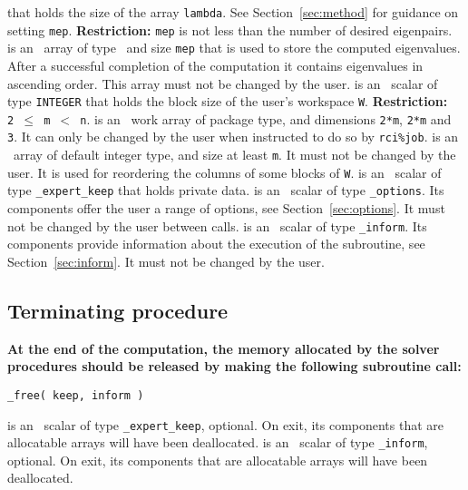 \begin{description}
that holds the size of the array {\tt lambda}.
See Section~\ref{sec:method} for guidance on
setting {\tt mep}.
{\bf Restriction:} 
{\tt mep} is not less than the number of desired eigenpairs.
%
 is an \intentinout\
array of type \REALDP\
and size {\tt mep} that is
used to store the computed eigenvalues.
After a successful completion of the computation
it contains eigenvalues in ascending order.
This array must not be changed by the user.
%
 is an \intentin\ scalar of type {\tt INTEGER} that
holds the block size of the user's workspace {\tt W}. 
{\bf Restriction:} \\{\tt 2 $\le$ m $<$ n}.
%
 is an \intentinout\
work array of package type,
and dimensions {\tt 2*m}, {\tt 2*m} and {\tt 3}.
It can only be changed by the user when
instructed to do so by 
{\tt rci\%job}.
%
 is an \intentinout\ 
array of default integer type, and size at least {\tt m}. 
It must not be changed by the user.
It is used for reordering the columns of some blocks of {\tt W}.
%
\itt{keep} is an \intentinout\ scalar of type 
{\tt \solver\_expert\_keep} 
that holds private data. 
%
\itt{options} is an \intentin\  scalar  of type {\tt \solver\_options}.
Its components offer the user a range of options,
see Section~\ref{sec:options}.
It must not be changed by the user between calls.
%
\itt{inform} is an \intentinout\ scalar of type 
{\tt \solver\_inform}. Its components provide information about the execution
of the subroutine, see Section~\ref{sec:inform}.
It must not be changed by the user.
%
\end{description}

\subsection{Terminating procedure}

{\bf
At the end of the computation, the memory 
allocated by the solver procedures
should be released
by making the following subroutine call:
}

\medskip

\hspace{8mm} {\tt \solver\_free( keep, inform )}

\begin{description}
%
\itt{keep} is an \intentinout\ scalar of type 
{\tt \solver\_expert\_keep}, optional. 
On exit, its components that are allocatable arrays will have been deallocated. 
%
\itt{inform} is an \intentinout\ scalar of type {\tt \solver\_inform}, 
optional.
On exit, its components that are allocatable arrays will have been deallocated. 
%
\end{description}

